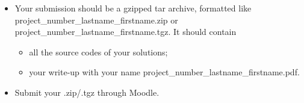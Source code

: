 \documentclass[unicode,11pt,a4paper,oneside,numbers=endperiod,openany]{scrartcl}
\begin{document}
\begin{itemize}
	\item Your submission should be a gzipped tar archive, formatted like project\_number\_lastname\_firstname.zip or project\_number\_lastname\_firstname.tgz. 
	It should contain
	\begin{itemize}
		\item all the source codes of your solutions;
		\item your write-up with your name  project\_number\_lastname\_firstname.pdf.
	\end{itemize}
	\item Submit your .zip/.tgz through Moodle.
\end{itemize}
\end{document}
